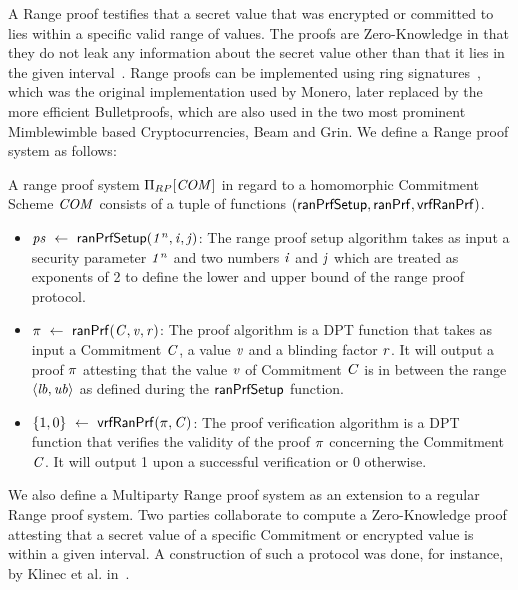 A Range proof testifies that a secret value that was encrypted or committed to lies within a specific valid range of values.
The proofs are Zero-Knowledge in that they do not leak any information about the secret value other than that it lies in the given interval~\cite{bunz2018bulletproofs}.
Range proofs can be implemented using ring signatures~\cite{noether2016ring}, which was the original implementation used by Monero, later replaced by the more efficient Bulletproofs\cite{bunz2018bulletproofs}, which are also used in the two most prominent Mimblewimble based Cryptocurrencies, Beam and Grin.
We define a Range proof system as follows:

\begin{definition}\label{def:pre:rangeproof}
    A range proof system $\Pi_{RP}[\mathit{COM}]$ in regard to a homomorphic Commitment Scheme $\mathit{COM}$ consists of a tuple of functions $(\mathsf{ranPrfSetup}, \mathsf{ranPrf}, \mathsf{vrfRanPrf})$.
    \begin{itemize}
        \item $\mathit{ps} ~\leftarrow~ \mathsf{ranPrfSetup}(\mathit{1^n},\mathit{i},\mathit{j})$: The range proof setup algorithm takes as input a security parameter $\mathit{1^n}$ and two numbers $\mathit{i}$ and $\mathit{j}$ which are treated as exponents of 2 to define the lower and upper bound of the range proof protocol.
        \item $\pi ~\leftarrow~ \mathsf{ranPrf}(\mathit{C},\mathit{v},\mathit{r})$: The proof algorithm is a DPT function that takes as input a Commitment $\mathit{C}$, a value $\mathit{v}$ and a blinding factor $\mathit{r}$.
        It will output a proof $\pi$ attesting that the value $\mathit{v}$ of Commitment $\mathit{C}$ is in between the range $\langle \mathit{lb}, \mathit{ub} \rangle$ as defined during the $\mathsf{ranPrfSetup}$ function.
        \item $\{1,0\} ~\leftarrow~ \mathsf{vrfRanPrf}(\pi,\mathit{C})$: The proof verification algorithm is a DPT function that verifies the validity of the proof $\pi$ concerning the Commitment $\mathit{C}$.
        It will output 1 upon a successful verification or 0 otherwise.
    \end{itemize}
\end{definition}

We also define a Multiparty Range proof system as an extension to a regular Range proof system. Two parties collaborate to compute a Zero-Knowledge proof attesting that a secret value of a specific Commitment or encrypted value is within a given interval.
A construction of such a protocol was done, for instance, by Klinec et al. in~\cite{klinec2020privacy}.

